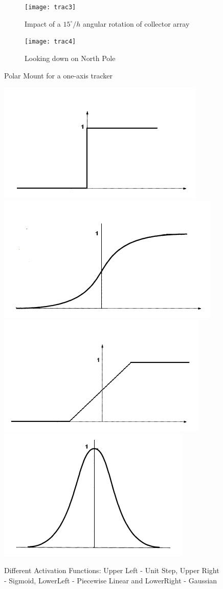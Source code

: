 \documentclass[12pt]{article}
\begin{document}

\begin{figure}[H]
    \centering
    \begin{subfigure}[b]{0.45\textwidth}
        \centering
        \texttt{[image: trac3]}
        \caption{Impact of a $15^{\circ}/h$ angular rotation of collector array}
        \label{a} %
    \end{subfigure}
    \hfill%
        \begin{subfigure}[b]{0.45\textwidth}
        \centering
        \texttt{[image: trac4]}
        \caption{Looking down on North Pole}
        \label{a} %
    \end{subfigure}
    \caption{Polar Mount for a one-axis tracker}
    \label{mfc4h1}
\end{figure}    
 
\begin{figure}[H]    
\begin{center}
\includegraphics[width=.4\textwidth]{ANNImg4}
\includegraphics[width=.4\textwidth]{ANNImg5}
\includegraphics[width=.4\textwidth]{ANNImg6}
\includegraphics[width=.4\textwidth]{ANNImg7}
\end{center}
\caption{Different Activation Functions: Upper Left - Unit Step, Upper Right - Sigmoid, LowerLeft - Piecewise Linear and LowerRight - Gaussian}    
\label{ANNActFunc}
\end{figure}    
        
\end{document}
